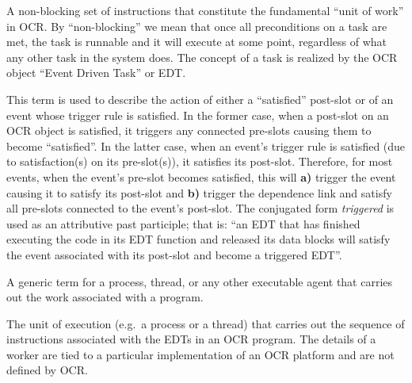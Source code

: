 \glossarydefstart
A non-blocking set of instructions that constitute the fundamental
``unit of work'' in OCR. By ``non-blocking'' we mean that once all
preconditions on a task are met, the task is runnable
and it will execute at some point, regardless of what any other
task in the system does. The concept of a task is realized by
the OCR object ``Event Driven Task'' or EDT.
\glossarydefend

\glossarydefstart
This term is used to describe the action of either a ``satisfied''
post-slot or of an event whose trigger rule is satisfied. In the
former case, when a post-slot on
an OCR object is satisfied, it triggers any connected
pre-slots causing them to become ``satisfied''. In the latter case,
when an event's trigger rule is satisfied (due to satisfaction(s) on its
pre-slot(s)), it satisfies its post-slot. Therefore, for most events,
when the event's pre-slot becomes satisfied, this will {\bf a)} trigger
the event causing it to satisfy its post-slot and {\bf b)} trigger
the dependence link and satisfy all pre-slots connected to the event's
post-slot. The conjugated form \emph{triggered} is used as an
attributive past participle; that is:
``an EDT that has finished executing the code in its EDT function and
released its data blocks will satisfy the event associated
with its post-slot and become a triggered EDT''.
\glossarydefend


\glossarydefstart
A generic term for a process, thread, or any other executable agent
that carries out the work associated with a program.
\glossarydefend


\glossarydefstart
The unit of execution (e.g.\ a process or a thread) that carries out
the sequence of instructions associated with the EDTs in an OCR
program. The details of a worker are tied to a particular
implementation of an OCR platform and are not defined by OCR.
\glossarydefend

